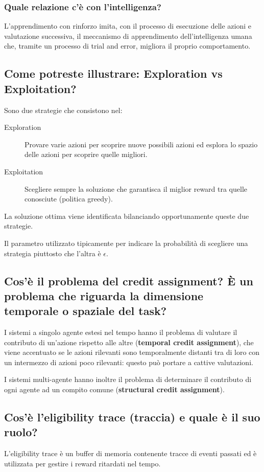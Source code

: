 \documentclass[\main/main.tex]{subfiles}
\begin{document}
\subsubsection{Quale relazione c'è con l'intelligenza?}
L'apprendimento con rinforzo imita, con il processo di esecuzione delle azioni e valutazione successiva, il meccanismo di apprendimento dell'intelligenza umana che, tramite un processo di trial and error, migliora il proprio comportamento.

\subsection{Come potreste illustrare: Exploration vs Exploitation?}
Sono due strategie che consistono nel:
\begin{description}
  \item[Exploration] Provare varie azioni per scoprire nuove possibili azioni ed esplora lo spazio delle azioni per scoprire quelle migliori.
  \item[Exploitation] Scegliere sempre la soluzione che garantisca il miglior reward tra quelle conosciute (politica greedy).
\end{description}
La soluzione ottima viene identificata bilanciando opportunamente queste due strategie.

Il parametro utilizzato tipicamente per indicare la probabilità di scegliere una strategia piuttosto che l'altra è $\epsilon$.

\subsection{Cos'è il problema del credit assignment? È un problema che riguarda la dimensione temporale o spaziale del task?}
I sistemi a singolo agente estesi nel tempo hanno il problema di valutare il contributo di un'azione rispetto alle altre (\textbf{temporal credit assignment}), che viene accentuato se le azioni rilevanti sono temporalmente distanti tra di loro con un intermezzo di azioni poco rilevanti: questo può portare a cattive valutazioni.

I sistemi multi-agente hanno inoltre il problema di determinare il contributo di ogni agente ad un compito comune (\textbf{structural credit assignment}).

\subsection{Cos'è l'eligibility trace (traccia) e quale è il suo ruolo?}
L'eligibility trace è un buffer di memoria contenente tracce di eventi passati ed è utilizzata per gestire i reward ritardati nel tempo.
\end{document}
